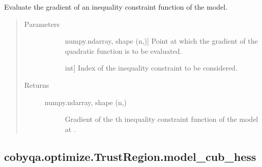 \documentclass[letterpaper,10pt,english]{sphinxmanual}
\begin{document}
\begin{fulllineitems}
\begin{fulllineitems}
\label{\detokenize{refs/generated/cobyqa.optimize.TrustRegion.model_cub_grad:cobyqa.optimize.TrustRegion.model_cub_grad}}
\sphinxAtStartPar
Evaluate the gradient of an inequality constraint function of the model.
\begin{quote}\begin{description}
\item[{Parameters}] \leavevmode\begin{description}
\item[{}] \leavevmode{[}numpy.ndarray, shape (n,){]}
\sphinxAtStartPar
Point at which the gradient of the quadratic function is to be
evaluated.

\item[{}] \leavevmode{[}int{]}
\sphinxAtStartPar
Index of the inequality constraint to be considered.

\end{description}

\item[{Returns}] \leavevmode\begin{description}
\item[{numpy.ndarray, shape (n,)}] \leavevmode
\sphinxAtStartPar
Gradient of the \sphinxhyphen{}th inequality constraint function of the model
at .

\end{description}

\end{description}\end{quote}

\end{fulllineitems}



\subsection{cobyqa.optimize.TrustRegion.model\_cub\_hess}
\label{\detokenize{refs/generated/cobyqa.optimize.TrustRegion.model_cub_hess:cobyqa-optimize-trustregion-model-cub-hess}}\label{\detokenize{refs/generated/cobyqa.optimize.TrustRegion.model_cub_hess::doc}}


\end{fulllineitems}
\end{document}
